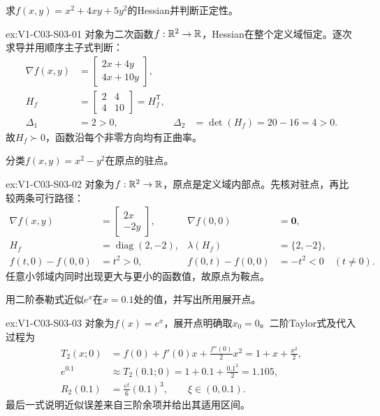 \begin{SLChapterExercisePairSection}
\begin{exercise}[Hessian]\label{ex:V1-C03-S03-01}
求$f(x,y)=x^2+4xy+5y^2$的Hessian并判断正定性。
\end{exercise}
\label{sol:V1-C03-S03-01}
\begin{chapterexercisesolution}{ex:V1-C03-S03-01}
对象为二次函数$f:\mathbb{R}^2\to\mathbb{R}$，Hessian在整个定义域恒定。逐次求导并用顺序主子式判断：
\[
\begin{aligned}
\nabla f(x,y)&=\begin{bmatrix}2x+4y\\4x+10y\end{bmatrix},\\
H_f&=\begin{bmatrix}2&4\\4&10\end{bmatrix}=H_f^{\mathsf T},\\
\Delta_1&=2>0,
&\Delta_2&=\det(H_f)=20-16=4>0.
\end{aligned}
\]
故$H_f\succ0$，函数沿每个非零方向均有正曲率。
\end{chapterexercisesolution}

\begin{exercise}[驻点分类]\label{ex:V1-C03-S03-02}
分类$f(x,y)=x^2-y^2$在原点的驻点。
\end{exercise}
\label{sol:V1-C03-S03-02}
\begin{chapterexercisesolution}{ex:V1-C03-S03-02}
对象为$f:\mathbb{R}^2\to\mathbb{R}$，原点是定义域内部点。先核对驻点，再比较两条可行路径：
\[
\begin{aligned}
\nabla f(x,y)&=\begin{bmatrix}2x\\-2y\end{bmatrix},
&\nabla f(0,0)&=\boldsymbol0,\\
H_f&=\operatorname{diag}(2,-2),
&\lambda(H_f)&=\{2,-2\},\\
f(t,0)-f(0,0)&=t^2>0,
&f(0,t)-f(0,0)&=-t^2<0\quad(t\ne0).
\end{aligned}
\]
任意小邻域内同时出现更大与更小的函数值，故原点为鞍点。
\end{chapterexercisesolution}

\begin{exercise}[二阶近似]\label{ex:V1-C03-S03-03}
用二阶泰勒式近似$e^x$在$x=0.1$处的值，并写出所用展开点。
\end{exercise}
\label{sol:V1-C03-S03-03}
\begin{chapterexercisesolution}{ex:V1-C03-S03-03}
对象为$f(x)=e^x$，展开点明确取$x_0=0$。二阶Taylor式及代入过程为
\[
\begin{aligned}
T_2(x;0)
&=f(0)+f'(0)x+\frac{f''(0)}{2}x^2
=1+x+\frac{x^2}{2},\\
e^{0.1}&\approx T_2(0.1;0)
=1+0.1+\frac{0.1^2}{2}=1.105,\\
R_2(0.1)&=\frac{e^\xi}{6}(0.1)^3,
\qquad \xi\in(0,0.1).
\end{aligned}
\]
最后一式说明近似误差来自三阶余项并给出其适用区间。
\end{chapterexercisesolution}


\end{SLChapterExercisePairSection}
